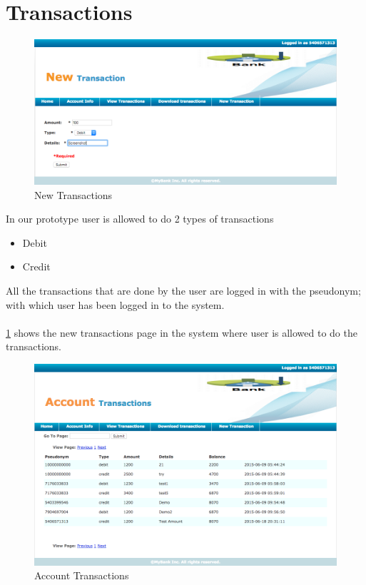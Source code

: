 \section{Transactions}
\begin{figure}
	\centering
	\includegraphics[width=\textwidth]{figures/New}
	\caption{New Transactions}
	\label{fig:New}
\end{figure}
In our prototype user is allowed to do 2 types of transactions
\begin{itemize}
	\item Debit
	\item Credit
\end{itemize}
All the transactions that are done by the user are logged in with the pseudonym; with which user has been logged in to the system.
\\
\\\ref{fig:New} shows the new transactions page in the system where user is allowed to do the transactions.
\begin{figure}[h]
		\centering
		\includegraphics[width=\textwidth]{figures/Transactions}
		\caption{Account Transactions}
		\label{fig:Transactions}
\end{figure}
